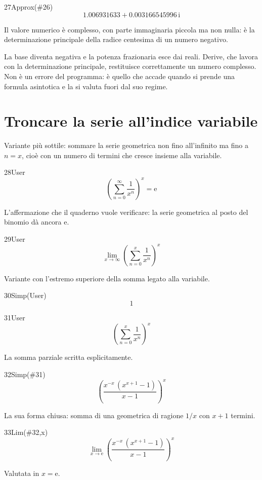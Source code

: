 \begin{espr}{27}{Approx(\#26)}{}
\[
1.006931633 + 0.003166545996\, \mathrm{i}
\]
\end{espr}
Il valore numerico è complesso, con parte immaginaria piccola ma non nulla: è la determinazione principale della radice centesima di un numero negativo.


La base diventa negativa e la potenza frazionaria esce dai reali. Derive, che lavora con la determinazione principale, restituisce correttamente un numero complesso. Non è un errore del programma: è quello che accade quando si prende una formula asintotica e la si valuta fuori dal suo regime.

\section{Troncare la serie all'indice variabile}

Variante più sottile: sommare la serie geometrica non fino all'infinito ma fino a $n=x$, cioè con un numero di termini che cresce insieme alla variabile.

\begin{espr}{28}{User}{}
\[
\left(\sum_{n=0}^{\infty} \frac{1}{x^{n}}\right)^{x} = \mathrm{e}
\]
\end{espr}
L'affermazione che il quaderno vuole verificare: la serie geometrica al posto del binomio dà ancora $\mathrm{e}$.

\begin{espr}{29}{User}{}
\[
\lim_{x \to \infty} \left(\sum_{n=0}^{x} \frac{1}{x^{n}}\right)^{x}
\]
\end{espr}
Variante con l'estremo superiore della somma legato alla variabile.

\begin{espr}{30}{Simp(User)}{}
\[
1
\]
\end{espr}
\begin{espr}{31}{User}{}
\[
\left(\sum_{n=0}^{x} \frac{1}{x^{n}}\right)^{x}
\]
\end{espr}
La somma parziale scritta esplicitamente.

\begin{espr}{32}{Simp(\#31)}{}
\[
\left(\frac{x^{-x}\, \left(x^{x + 1} - 1\right)}{x - 1}\right)^{x}
\]
\end{espr}
La sua forma chiusa: somma di una geometrica di ragione $1/x$ con $x+1$ termini.

\begin{espr}{33}{Lim(\#32,x)}{}
\[
\lim_{x \to \mathrm{e}} \left(\frac{x^{-x}\, \left(x^{x + 1} - 1\right)}{x - 1}\right)^{x}
\]
\end{espr}
Valutata in $x=\mathrm{e}$.

